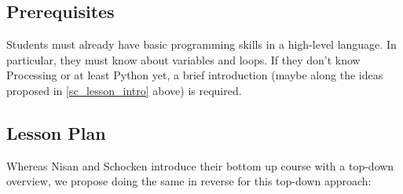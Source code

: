 \subsection{Prerequisites}

Students must already have basic programming skills in a high-level language. In particular, they must know about variables and loops. If they don't know Processing or at least Python yet, a brief introduction (maybe along the ideas proposed in \ref{sc_lesson_intro} above) is required.


\subsection{Lesson Plan}

Whereas Nisan and Schocken \cite{Nis21} introduce their bottom up course with a top-down overview, we propose doing the same in reverse for this top-down approach:

